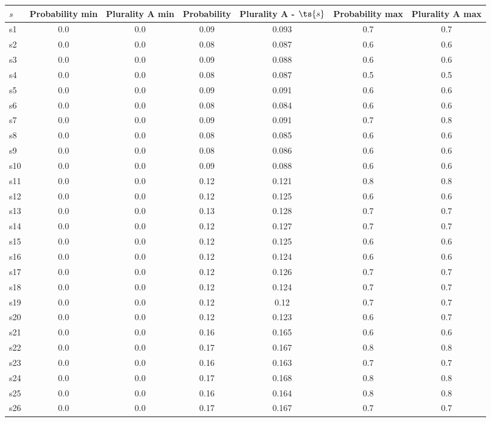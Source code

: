 \documentclass{article}
\begin{document}
\noindent\begin{tabular}{|l|c|c|c|c|c|c|}
\hline
$s$& Probability min & Plurality A min & Probability & Plurality A - $\ts{s}$ & Probability max & Plurality A max\\
\hline
s1 &0.0 & 0.0 & 0.09 & 0.093 & 0.7 & 0.7\\
\hline
s2 &0.0 & 0.0 & 0.08 & 0.087 & 0.6 & 0.6\\
\hline
s3 &0.0 & 0.0 & 0.09 & 0.088 & 0.6 & 0.6\\
\hline
s4 &0.0 & 0.0 & 0.08 & 0.087 & 0.5 & 0.5\\
\hline
s5 &0.0 & 0.0 & 0.09 & 0.091 & 0.6 & 0.6\\
\hline
s6 &0.0 & 0.0 & 0.08 & 0.084 & 0.6 & 0.6\\
\hline
s7 &0.0 & 0.0 & 0.09 & 0.091 & 0.7 & 0.8\\
\hline
s8 &0.0 & 0.0 & 0.08 & 0.085 & 0.6 & 0.6\\
\hline
s9 &0.0 & 0.0 & 0.08 & 0.086 & 0.6 & 0.6\\
\hline
s10 &0.0 & 0.0 & 0.09 & 0.088 & 0.6 & 0.6\\
\hline
s11 &0.0 & 0.0 & 0.12 & 0.121 & 0.8 & 0.8\\
\hline
s12 &0.0 & 0.0 & 0.12 & 0.125 & 0.6 & 0.6\\
\hline
s13 &0.0 & 0.0 & 0.13 & 0.128 & 0.7 & 0.7\\
\hline
s14 &0.0 & 0.0 & 0.12 & 0.127 & 0.7 & 0.7\\
\hline
s15 &0.0 & 0.0 & 0.12 & 0.125 & 0.6 & 0.6\\
\hline
s16 &0.0 & 0.0 & 0.12 & 0.124 & 0.6 & 0.6\\
\hline
s17 &0.0 & 0.0 & 0.12 & 0.126 & 0.7 & 0.7\\
\hline
s18 &0.0 & 0.0 & 0.12 & 0.124 & 0.7 & 0.7\\
\hline
s19 &0.0 & 0.0 & 0.12 & 0.12 & 0.7 & 0.7\\
\hline
s20 &0.0 & 0.0 & 0.12 & 0.123 & 0.6 & 0.7\\
\hline
s21 &0.0 & 0.0 & 0.16 & 0.165 & 0.6 & 0.6\\
\hline
s22 &0.0 & 0.0 & 0.17 & 0.167 & 0.8 & 0.8\\
\hline
s23 &0.0 & 0.0 & 0.16 & 0.163 & 0.7 & 0.7\\
\hline
s24 &0.0 & 0.0 & 0.17 & 0.168 & 0.8 & 0.8\\
\hline
s25 &0.0 & 0.0 & 0.16 & 0.164 & 0.8 & 0.8\\
\hline
s26 &0.0 & 0.0 & 0.17 & 0.167 & 0.7 & 0.7\\

\end{tabular}
\end{document}
